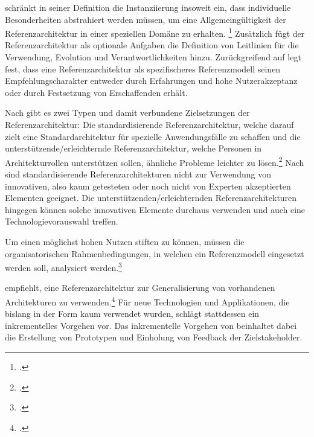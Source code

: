 \citeauthor{Trefke.2012} schränkt in seiner Definition die Instanziierung insoweit ein, dass individuelle Besonderheiten abstrahiert werden müssen, um eine Allgemeingültigkeit der Referenzarchitektur in einer speziellen Domäne zu erhalten.  \footcite[Vgl. auch im Folgenden][]{Trefke.2012} Zusätzlich fügt \citeauthor{Trefke.2012} der Referenzarchitektur als optionale Aufgaben die Definition von Leitlinien für die Verwendung, Evolution und Verantwortlichkeiten hinzu. Zurückgreifend auf \citeauthor{vomBrocke.2003} legt \citeauthor{Trefke.2012} fest, dass eine Referenzarchitektur als spezifischeres Referenzmodell seinen Empfehlungscharakter entweder durch Erfahrungen und hohe Nutzerakzeptanz oder durch Festsetzung von Erschaffenden erhält.

Nach \citeauthor{Angelov.2012} gibt es zwei Typen und damit verbundene Zielsetzungen der Referenzarchitektur: Die standardisierende Referenzarchitektur, welche darauf zielt eine Standardarchitektur für spezielle Anwendungsfälle zu schaffen und die unterstützende/erleichternde Referenzarchitektur, welche Personen in Architekturrollen unterstützen sollen, ähnliche Probleme leichter zu lösen.\footcite[Vgl. auch im Folgenden][S.~422~ff.]{Angelov.2012} Nach \citeauthor{Angelov.2012} sind standardisierende Referenzarchitekturen nicht zur Verwendung von innovativen, also kaum getesteten oder noch nicht von Experten akzeptierten Elementen geeignet. Die unterstützenden/erleichternden Referenzarchitekturen hingegen können solche innovativen Elemente durchaus verwenden und auch eine Technologievorauswahl treffen.

Um einen möglichst hohen Nutzen stiften zu können, müssen die organisatorischen Rahmenbedingungen, in welchen ein Referenzmodell eingesetzt werden soll, analysiert werden.\footcite[Vgl.][]{vomBrocke.2004}

\citeauthor{Muller.2020} empfiehlt, eine Referenzarchitektur zur Generalisierung von vorhandenen Architekturen zu verwenden.\footcite[Vgl. auch im Folgenden][7]{Muller.2020} Für neue Technologien und Applikationen, die bislang in der Form kaum verwendet wurden, schlägt \citeauthor{Muller.2020} stattdessen ein inkrementelles Vorgehen vor. Das inkrementelle Vorgehen von \citeauthor{Muller.2020} beinhaltet dabei die Erstellung von Prototypen und Einholung von Feedback der Zielstakeholder. 


